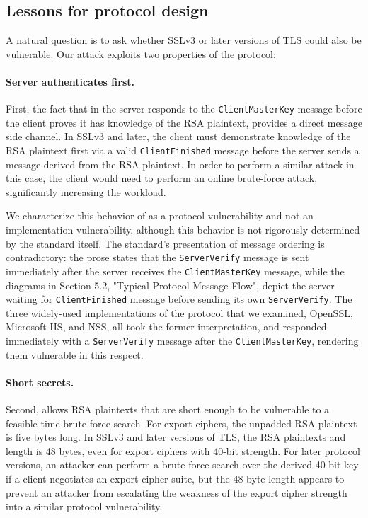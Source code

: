 \ifext
\subsection{Lessons for protocol design}
A natural question is to ask whether SSLv3 or later versions of TLS could also be vulnerable.
Our attack exploits two properties of the \ssltwo protocol:

\paragraph{Server authenticates first.} 
First, the fact that in \ssltwo the server responds to the \texttt{ClientMasterKey} message before the client proves it has knowledge of the RSA plaintext, provides a direct message side channel. In SSLv3 and later, the client must demonstrate knowledge of the RSA plaintext first via a valid \texttt{ClientFinished} message before the server sends a message derived from the RSA plaintext.  In order to perform a similar attack in this case, the client would need to perform an online brute-force attack\ifext, significantly increasing the workload\fi.

We characterize this behavior of \ssltwo as a protocol vulnerability and not an implementation vulnerability, although this behavior is not rigorously determined by the standard itself.  The standard's presentation of message ordering is contradictory: the prose states that the \texttt{ServerVerify} message is sent immediately after the server receives the \texttt{ClientMasterKey} message, while the diagrams in Section 5.2, "Typical Protocol Message Flow", depict the server waiting for \texttt{ClientFinished} message before sending its own \texttt{ServerVerify}.  The three widely-used implementations of the protocol that we examined, OpenSSL, Microsoft IIS, and NSS, all took the former interpretation, and responded immediately with a \texttt{ServerVerify} message after the \texttt{ClientMasterKey}, rendering them vulnerable in this respect.

\paragraph{Short secrets.} Second, \ssltwo allows RSA plaintexts that are short enough to be vulnerable to a feasible-time brute force search.  For export ciphers, the unpadded RSA plaintext is five bytes long.  In SSLv3 and later versions of TLS, the RSA plaintexts and \pms length is 48 bytes, even for export ciphers with 40-bit strength.  For later protocol versions, an attacker can perform a brute-force search over the derived 40-bit key if a client negotiates an export cipher suite, but the 48-byte \pms length appears to prevent an attacker from escalating the weakness of the export cipher strength into a similar protocol vulnerability.
\fi

